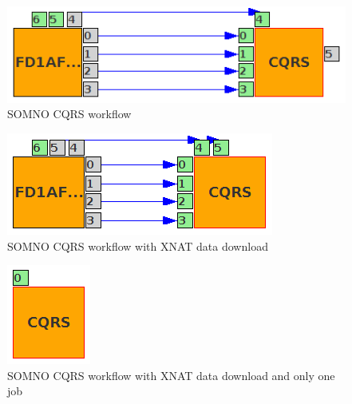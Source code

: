 \begin{figure}%
                \centering
                \includegraphics[width=1.0\columnwidth]{images/SOMNO_CQRS.png}
                \caption{SOMNO CQRS workflow}
                \label{fig:CQRSworkflow}
\end{figure}

\begin{figure}%
                \centering
                \includegraphics[width=0.8\columnwidth]{images/SOMNO_CQRS_DL_SAMPLE.png}
                \caption{SOMNO CQRS workflow with XNAT data download}
                \label{fig:CQRSDLworkflow}
\end{figure}

\begin{figure}%
                \centering
                \includegraphics[width=0.3\columnwidth]{images/SOMNO_CQRS_ONE_SAMPLE.png}
                \caption{SOMNO CQRS workflow with XNAT data download and only one job}
                \label{fig:CQRSONEworkflow}
\end{figure}